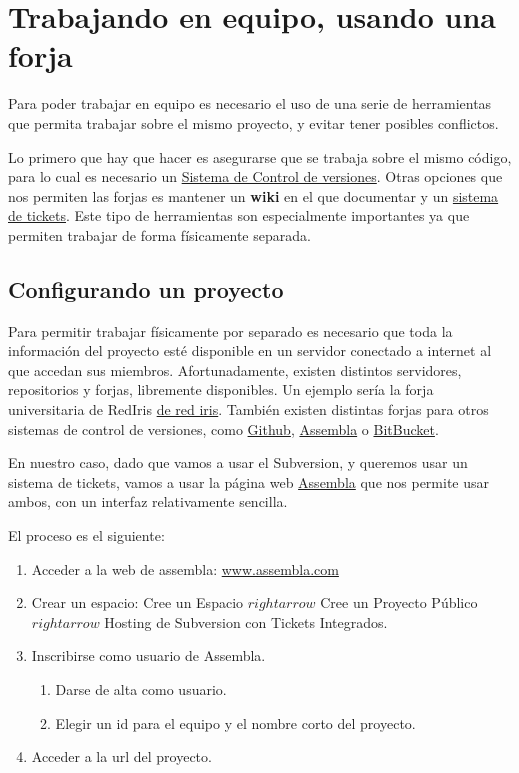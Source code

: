 \documentclass[11pt]{article}
\begin{document}
\section{Trabajando en equipo, usando una forja} \label{sec-7}

Para poder trabajar en equipo es necesario el uso de una serie de herramientas
que permita trabajar sobre el mismo proyecto, y evitar tener posibles
conflictos.

Lo primero que hay que hacer es asegurarse que se trabaja sobre el mismo código,
para lo cual es necesario un \hyperref[sec-7-2]{Sistema de Control de
versiones}. Otras opciones que nos permiten las forjas es mantener un \textbf{wiki} en el
que documentar y un \hyperref[sec-7-4]{sistema de tickets}. Este tipo de
herramientas son especialmente importantes ya que permiten trabajar de forma
físicamente separada.


\subsection{Configurando un proyecto} \label{sec-7-1}

Para permitir trabajar físicamente por separado es necesario que toda la información
del proyecto esté disponible en un servidor conectado a internet al que 
accedan sus miembros. Afortunadamente, existen distintos servidores, repositorios y forjas,
libremente disponibles. Un ejemplo sería la forja universitaria de RedIris \href{http://forja.rediris.es}{de red iris}. También existen distintas forjas para otros sistemas de control de versiones, como
\href{http://github.com}{Github}, \href{http://www.assembla/}{Assembla} o \href{http://bitbucket.org}{BitBucket}.

En nuestro caso, dado que vamos a usar el Subversion, y queremos usar un sistema
de tickets, vamos a usar la página web \href{http://www.assembla.com}{Assembla}
que nos permite usar ambos, con un interfaz relativamente sencilla.

El proceso es el siguiente:

\begin{enumerate}

\item Acceder a la web de assembla: \href{http://www.assembla.com}{www.assembla.com}

\item Crear un espacio: Cree un Espacio $rightarrow$ Cree un Proyecto Público $rightarrow$ Hosting de Subversion con Tickets Integrados.

\item Inscribirse como usuario de Assembla.

\begin{enumerate}
  \item Darse de alta como usuario.
  \item Elegir un id para el equipo y el nombre corto del proyecto.
\end{enumerate}

\item Acceder a la url del proyecto.

\end{enumerate}
\end{document}
